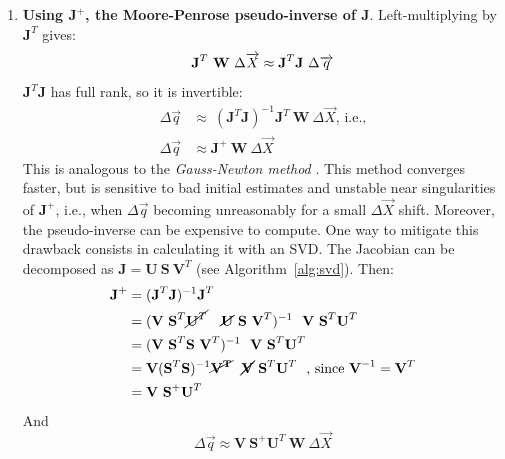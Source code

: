 \begin{enumerate}[itemsep=0em, topsep=0em, leftmargin=*]
    \item \textbf{Using $\textbf{J}^+$, the Moore-Penrose pseudo-inverse of J}. Left-multiplying by $\textbf{J}^T$ gives:
    \begin{equation}
        \textbf{J}^T \ \textbf{W} \ \Delta\overrightarrow{X} \approx \textbf{J}^T \textbf{J} \ \Delta\overrightarrow{q}\\
    \end{equation}
    $\textbf{J}^T \textbf{J}$ has full rank, so it is invertible:
    \begin{equation}\label{eq:pseudoinv}
      \begin{aligned}
        \Delta \overrightarrow{q} &\approx \ (\textbf{J}^T \textbf{J})^{-1} \textbf{J}^T \ \textbf{W} \ \Delta\overrightarrow{X} \text{, i.e.,} \\
        \Delta \overrightarrow{q} &\approx \textbf{J}^+ \ \textbf{W} \ \Delta\overrightarrow{X} 
      \end{aligned}
    \end{equation} 
    This is analogous to the \emph{Gauss-Newton method} \cite{Nocedal1999}. This method converges faster, but is sensitive to bad initial estimates and unstable near singularities of $\textbf{J}^+$, i.e., when $\Delta \overrightarrow{q}$ becoming unreasonably for a small $\Delta \overrightarrow{X}$ shift. Moreover, the pseudo-inverse can be expensive to compute. One way to mitigate this drawback consists in calculating it with an SVD. The Jacobian can be decomposed as $\textbf{J} = \textbf{U} \ \textbf{S} \ \textbf{V}^T$ (see Algorithm~\ref{alg:svd}). Then:
    \begin{equation}
          \begin{aligned}
          \textbf{J}^+
          & = (\textbf{J}^T \textbf{J})^{-1} \textbf{J}^T \\
          & = (\textbf{V} \ \textbf{S}^T \cancel{\textbf{U}^T} \ \ \
          \cancel{\textbf{U}} \ \textbf{S} \ \textbf{V}^T)^{-1} \ \  
          \textbf{V} \ \textbf{S}^T \textbf{U}^T \ \ \\
          & = (\textbf{V} \ \textbf{S}^T\textbf{S}\ \textbf{V}^T)^{-1} \ \  
          \textbf{V} \ \textbf{S}^T \textbf{U}^T \ \ \\
          & = \textbf{V} (\textbf{S}^T\textbf{S})^{-1} \cancel{\mathbf{V^T}} \ \  
          \cancel{\textbf{V}} \ \textbf{S}^T \textbf{U}^T \ \ \text{, since }\textbf{V}^{-1}=\textbf{V}^T\\
          & = \textbf{V} \ \textbf{S}^{+} \textbf{U}^T \ \ \\
        \end{aligned}
      \end{equation}
      And 
      \begin{equation}
        \Delta \overrightarrow{q} \approx \textbf{V} \ \textbf{S}^{+} \textbf{U}^T \ \textbf{W} \ \Delta\overrightarrow{X} 
      \end{equation}


\end{enumerate}
